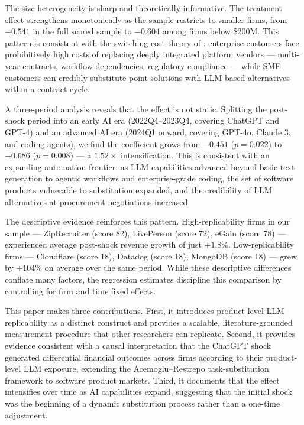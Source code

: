 \documentclass[12pt,a4paper]{article}
\begin{document}
The size heterogeneity is sharp and theoretically informative. The treatment effect strengthens monotonically as the sample restricts to smaller firms, from $-0.541$ in the full scored sample to $-0.604$ among firms below \$200M. This pattern is consistent with the switching cost theory of \citet{farrell2007}: enterprise customers face prohibitively high costs of replacing deeply integrated platform vendors --- multi-year contracts, workflow dependencies, regulatory compliance --- while SME customers can credibly substitute point solutions with LLM-based alternatives within a contract cycle.

A three-period analysis reveals that the effect is not static. Splitting the post-shock period into an early AI era (2022Q4--2023Q4, covering ChatGPT and GPT-4) and an advanced AI era (2024Q1 onward, covering GPT-4o, Claude 3, and coding agents), we find the coefficient grows from $-0.451$ ($p = 0.022$) to $-0.686$ ($p = 0.008$) --- a $1.52\times$ intensification. This is consistent with an expanding automation frontier: as LLM capabilities advanced beyond basic text generation to agentic workflows and enterprise-grade coding, the set of software products vulnerable to substitution expanded, and the credibility of LLM alternatives at procurement negotiations increased.

The descriptive evidence reinforces this pattern. High-replicability firms in our sample --- ZipRecruiter (score 82), LivePerson (score 72), eGain (score 78) --- experienced average post-shock revenue growth of just $+1.8\%$. Low-replicability firms --- Cloudflare (score 18), Datadog (score 18), MongoDB (score 18) --- grew by $+104\%$ on average over the same period. While these descriptive differences conflate many factors, the regression estimates discipline this comparison by controlling for firm and time fixed effects.

This paper makes three contributions. First, it introduces product-level LLM replicability as a distinct construct and provides a scalable, literature-grounded measurement procedure that other researchers can replicate. Second, it provides evidence consistent with a causal interpretation that the ChatGPT shock generated differential financial outcomes across firms according to their product-level LLM exposure, extending the Acemoglu--Restrepo task-substitution framework to software product markets. Third, it documents that the effect intensifies over time as AI capabilities expand, suggesting that the initial shock was the beginning of a dynamic substitution process rather than a one-time adjustment.
\end{document}
